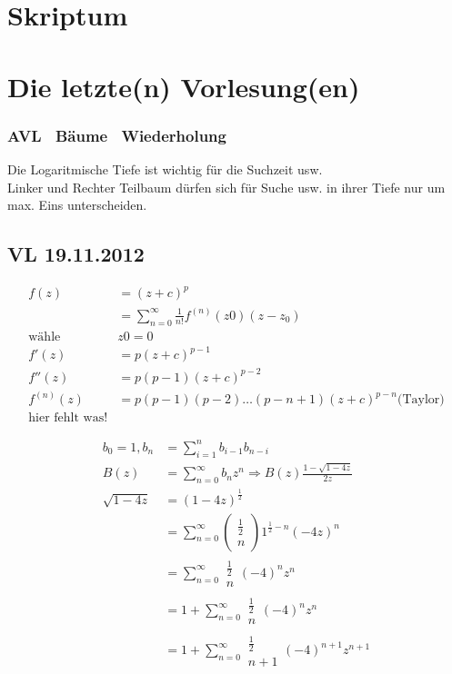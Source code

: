 \documentclass[a4paper,twoside,10pt]{report}
\begin{document}
\part{Skriptum}

\part{Die letzte(n) Vorlesung(en)}
\section{AVL \, Bäume \, Wiederholung}

Die Logaritmische Tiefe ist wichtig für die Suchzeit usw.\\
Linker und Rechter Teilbaum dürfen sich für Suche usw. in ihrer Tiefe nur um max. Eins unterscheiden.

\chapter{VL 19.11.2012}
\begin{align*}
f(z) &=(z+c)^p \\
&=\sum_{n=0}^\infty \frac{1}{n!}f^{(n)}(z0)(z-z_0)\\
\mbox{wähle }&z0=0\\
f'(z)&=p(z+c)^{p-1}\\
f''(z)&=p(p-1)(z+c)^{p-2}\\
f^{(n)}(z)&=p(p-1)(p-2)\hdots(p-n+1)(z+c)^{p-n}\mbox{(Taylor)}\\
\mbox{hier fehlt was!}
\end{align*}

\begin{align*}
b_0=1,b_n&=\sum_{i=1}^nb_{i-1}b_{n-i}\\
B(z)&=\sum_{n=0}^\infty b_nz^n\Rightarrow B(z)\frac{1-\sqrt{1-4z}}{2z}\\
\sqrt{1-4z}&=(1-4z)^\frac{1}{2}\\
&=\sum_{n=0}^\infty \left(\begin{array}{c}\frac{1}{2}\\n\end{array}\right)1^{\frac{1}{2}-n}(-4z)^n\\
&=\sum_{n=0}^\infty\begin{array}{c}\frac{1}{2}\\n\end{array}(-4)^nz^n\\
&=1+\sum_{n=0}^\infty \begin{array}{c}\frac{1}{2}\\n\end{array}(-4)^nz^n\\
&=1+\sum_{n=0}^\infty \begin{array}{c}\frac{1}{2}\\n+1\end{array}(-4)^{n+1}z^{n+1}
\end{align*}
\end{document}

